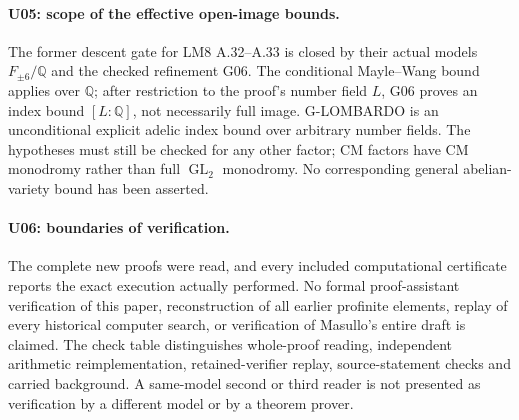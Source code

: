 \documentclass[11pt,a4paper]{article}
\begin{document}
\paragraph{U05: scope of the effective open-image bounds.}
The former descent gate for LM8 A.32--A.33 is closed by their actual
models $F_{\pm6}/\mathbb Q$ and the checked refinement G06.
The conditional Mayle--Wang bound applies over $\mathbb Q$; after
restriction to the proof's number field $L$, G06 proves an index
bound $[L:\mathbb Q]$, not necessarily full image.
G-LOMBARDO is an unconditional explicit adelic index bound over
arbitrary number fields. The hypotheses must still be checked for
any other factor; CM factors have CM monodromy rather than full
$\operatorname{GL}_2$ monodromy. No corresponding general abelian-variety
bound has been asserted.

\paragraph{U06: boundaries of verification.}
The complete new proofs were read, and every included computational
certificate reports the exact execution actually performed. No
formal proof-assistant verification of this paper, reconstruction
of all earlier profinite elements, replay of every historical
computer search, or verification of Masullo's entire draft is
claimed. The check table distinguishes whole-proof reading,
independent arithmetic reimplementation, retained-verifier replay,
source-statement checks and carried background. A same-model second
or third reader is not presented as verification by a different
model or by a theorem prover.
\end{document}
